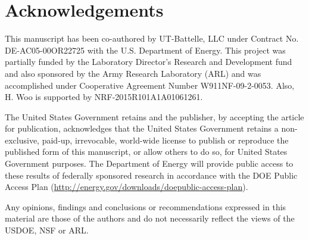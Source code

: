 \section{Acknowledgements}

This manuscript has been co-authored by UT-Battelle, LLC under Contract No. DE-AC05-00OR22725 with the U.S. Department of Energy.  This project was partially funded by the Laboratory Director's Research and Development fund and also sponsored by the Army Research Laboratory (ARL) and was accomplished under Cooperative Agreement Number W911NF-09-2-0053. Also, H. Woo is supported by NRF-2015R101A1A01061261. 


The United States Government retains and the publisher, by accepting the article for publication, acknowledges that the United States Government retains a non-exclusive, paid-up, irrevocable, world-wide license to publish or reproduce the published form of this manuscript, or allow others to do so, for United States Government purposes. The Department of Energy will provide public access to these results of federally sponsored research in accordance with the DOE Public Access Plan (\url{http://energy.gov/downloads/doepublic-access-plan}).

Any opinions, findings and conclusions or recommendations expressed in this material are those of the authors and do not necessarily reflect the views of the USDOE, NSF or ARL.
